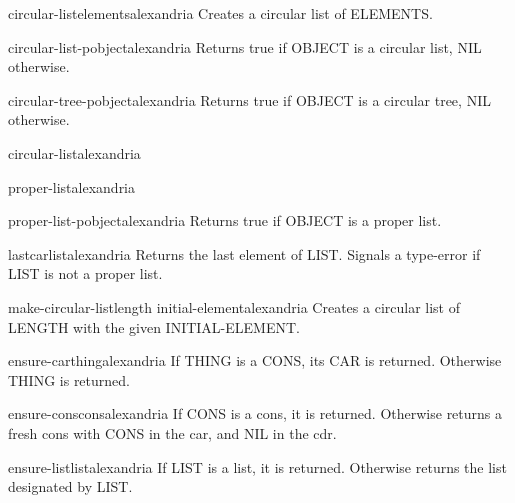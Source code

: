 \begin{function}{circular-list}{\rest elements}{alexandria}{}
  Creates a circular list of ELEMENTS.
\end{function}

\begin{function}{circular-list-p}{object}{alexandria}{}
  Returns true if OBJECT is a circular list, NIL otherwise.
\end{function}

\begin{function}{circular-tree-p}{object}{alexandria}{}
  Returns true if OBJECT is a circular tree, NIL otherwise.
\end{function}

\begin{type}{circular-list}{}{alexandria}{}
  
\end{type}

\begin{type}{proper-list}{}{alexandria}{}
  
\end{type}

\begin{function}{proper-list-p}{object}{alexandria}{}
  Returns true if OBJECT is a proper list.
\end{function}

\begin{function}{lastcar}{list}{alexandria}{}
  Returns the last element of LIST. Signals a type-error if LIST is not a
proper list.
\end{function}

\begin{function}{make-circular-list}{length \key initial-element}{alexandria}{}
  Creates a circular list of LENGTH with the given INITIAL-ELEMENT.
\end{function}

\begin{function}{ensure-car}{thing}{alexandria}{}
  If THING is a CONS, its CAR is returned. Otherwise THING is returned.
\end{function}

\begin{function}{ensure-cons}{cons}{alexandria}{}
  If CONS is a cons, it is returned. Otherwise returns a fresh cons with CONS
  in the car, and NIL in the cdr.
\end{function}

\begin{function}{ensure-list}{list}{alexandria}{}
  If LIST is a list, it is returned. Otherwise returns the list designated by LIST.
\end{function}

